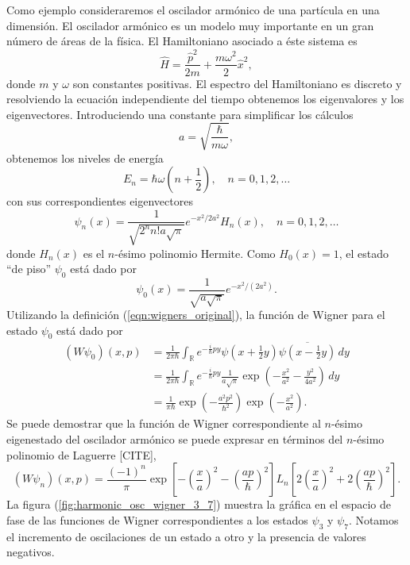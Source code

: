 \documentclass[a4paper]{report}
\DeclareMathOperator{\R}{\mathbb{R}}
\begin{document}
  Como ejemplo consideraremos el oscilador armónico de una
  partícula en una dimensión. El oscilador armónico es un
  modelo muy importante en un gran número de áreas de la
  física.  El Hamiltoniano asociado a éste sistema es
  \begin{equation}
    \hat{H}
    = \frac{\hat{p}^2}{2m} + \frac{m\omega^2}{2}
    \hat{x}^2,
  \end{equation}
  donde $m$ y $\omega$ son constantes positivas. El espectro
  del Hamiltoniano es discreto y resolviendo la ecuación
  independiente del tiempo obtenemos los eigenvalores y los
  eigenvectores. Introduciendo una constante para
  simplificar los cálculos
  \[
    a = \sqrt{\frac{\hbar}{m \omega}},
  \]
  obtenemos los niveles de energía
  \begin{equation}
    E_n
    = \hbar \omega \left( n + \frac{1}{2} \right),
    \quad n = 0,1,2,\ldots
  \end{equation}
  con sus correspondientes eigenvectores
  \begin{equation}
    \psi_n(x)
    = \frac{1}{\sqrt{2^{n} n! a \sqrt{\pi}}} e^{-x^2 / 2a^2}
    H_n(x),
    \quad n = 0, 1, 2,\ldots
  \end{equation}
  donde $H_n(x)$ es el $n$-ésimo polinomio Hermite.
  Como $H_0(x) = 1$, el estado ``de piso'' $\psi_0$ está
  dado por
  \[
    \psi_0(x)
    = \frac{1}{\sqrt{a \sqrt{\pi}}} e^{-x^2 / (2a^2)}.
  \]
  Utilizando la definición (\ref{eqn:wigners_original}), la
  función de Wigner para el estado $\psi_0$ está dado por
  \begin{align*}
    (W\psi_0)(x,p)
    &= \frac{1}{2\pi\hbar} \int_{\R} e^{-\frac{i}{\hbar} p y}
    \psi(x + \tfrac{1}{2}y) \overline{\psi(x -
    \tfrac{1}{2}y)} \, dy \\
    &= \frac{1}{2\pi\hbar} \int_{\R} e^{-\frac{i}{\hbar}py}
    \frac{1}{a\sqrt{\pi}}\exp\left( -\frac{x^2}{a^2} -
    \frac{y^2}{4a^2} \right)  \, dy \\
    &= \frac{1}{\pi\hbar} \exp\left( -\frac{a^2
    p^2}{\hbar^2} \right) \exp\left( -\frac{x^2}{a^2}
    \right). 
  \end{align*}
  Se puede demostrar que la función de Wigner
  correspondiente al $n$-ésimo eigenestado del oscilador
  armónico se puede expresar en términos del $n$-ésimo polinomio
  de Laguerre [CITE], 
  \[
    (W\psi_n)(x,p)
    = \frac{(-1)^{n}}{\pi} \exp\left[ -\left( \frac{x}{a}
    \right)^2 - \left( \frac{ap}{\hbar} \right)^2 \right]
    L_n\left[ 2\left( \frac{x}{a} \right)^2 + 2\left(
    \frac{ap}{\hbar} \right)^2 \right].
  \] 
  La figura (\ref{fig:harmonic_osc_wigner_3_7}) muestra la
  gráfica en el espacio de fase de las funciones de Wigner
  correspondientes a los estados $\psi_3$ y $\psi_7$.
  Notamos el incremento de oscilaciones de un estado a otro
  y la presencia de valores negativos.
  
\end{document}
